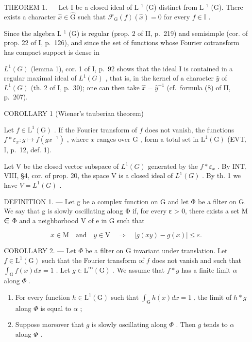 THEOREM 1. --- Let I be a closed ideal of L \(^{1}\) (G) distinct from L \(^{1}\) (G). There exists a character \(\widehat{x} \in \widehat{\mathrm{G}}\) such that \(\mathcal{F}_{\mathrm{G}}(f)(\widehat{x}) = 0\) for every \(f \in \mathrm{I}\) .

Since the algebra L \(^{1}\) (G) is regular (prop. 2 of II, p.~219) and semisimple (cor. of prop. 22 of I, p.~126), and since the set of functions whose Fourier cotransform has compact support is dense in

\(L^{1}(G)\) (lemma 1), cor. 1 of I, p.~92 shows that the ideal I is contained in a regular maximal ideal of \(L^{1}(G)\) , that is, in the kernel of a character \(\widehat{y}\) of \(L^{1}(G)\) (th. 2 of I, p.~30); one can then take \(\widehat{x} = \widehat{y}^{-1}\) (cf.~formula (8) of II, p.~207).

COROLLARY 1 (Wiener's tauberian theorem)

Let \(f \in \mathrm{L}^1(\mathrm{G})\) . If the Fourier transform of \(f\) does not vanish, the functions \(f * \varepsilon_x \colon g \mapsto f(gx^{-1})\) , where \(x\) ranges over \(\mathrm{G}\) , form a total set in \(\mathrm{L}^1(\mathrm{G})\) (EVT, I, p.~12, def. 1).

Let V be the closed vector subspace of \(L^{1}(G)\) generated by the \(f*\varepsilon_{x}\) . By INT, VIII, §4, cor. of prop. 20, the space V is a closed ideal of \(L^{1}(G)\) . By th. 1 we have \(V = L^{1}(G)\) .

DEFINITION 1. --- Let g be a complex function on G and let Φ be a filter on G. We say that g is slowly oscillating along Φ if, for every ε \textgreater{} 0, there exists a set M ∈ Φ and a neighborhood V of e in G such that

\[
 x \in \mathrm{M} \quad \text {and} \quad y \in \mathrm{V} \quad \Longrightarrow \quad | g (x y) - g (x) | \leqslant \varepsilon .
\]

COROLLARY 2. --- Let \(\Phi\) be a filter on G invariant under translation. Let \(f \in \mathrm{L}^{1}(\mathrm{G})\) such that the Fourier transform of \(f\) does not vanish and such that \(\int_{\mathrm{G}} f(x) dx = 1\) . Let \(g \in \mathrm{L}^{\infty}(\mathrm{G})\) . We assume that \(f * g\) has a finite limit \(\alpha\) along \(\Phi\) .

\begin{enumerate}
\def\labelenumi{\alph{enumi})}
\item
  For every function \(h \in \mathrm{L}^{1}(\mathrm{G})\) such that \(\int_{\mathrm{G}} h(x) dx = 1\) , the limit of \(h * g\) along \(\Phi\) is equal to \(\alpha\) ;
\item
  Suppose moreover that \(g\) is slowly oscillating along \(\Phi\) . Then \(g\) tends to \(\alpha\) along \(\Phi\) .
\end{enumerate}

